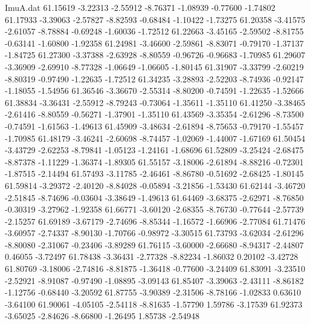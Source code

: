 \begin{filecontents}{ImuA.dat}
  61.15619   -3.22313   -2.55912   -8.76371   -1.08939   -0.77600   -1.74802
  61.17933   -3.39063   -2.57827   -8.82593   -0.68484   -1.10422   -1.73275
  61.20358   -3.41575   -2.61057   -8.78884   -0.69248   -1.60036   -1.72512
  61.22663   -3.45165   -2.59502   -8.81755   -0.63141   -1.60800   -1.92358
  61.24981   -3.46600   -2.59861   -8.83071   -0.79170   -1.37137   -1.84725
  61.27300   -3.37388   -2.63928   -8.80559   -0.96726   -0.96683   -1.70985
  61.29607   -3.36909   -2.69910   -8.77328   -1.06649   -1.06605   -1.80145
  61.31907   -3.33799   -2.60219   -8.80319   -0.97490   -1.22635   -1.72512
  61.34235   -3.28893   -2.52203   -8.74936   -0.92147   -1.18055   -1.54956
  61.36546   -3.36670   -2.55314   -8.80200   -0.74591   -1.22635   -1.52666
  61.38834   -3.36431   -2.55912   -8.79243   -0.73064   -1.35611   -1.35110
  61.41250   -3.38465   -2.61416   -8.80559   -0.56271   -1.37901   -1.35110
  61.43569   -3.35354   -2.61296   -8.73500   -0.74591   -1.61563   -1.49613
  61.45909   -3.48634   -2.61894   -8.75653   -0.79170   -1.55457   -1.70985
  61.48179   -3.46241   -2.60698   -8.74457   -1.02069   -1.44007   -1.67169
  61.50454   -3.43729   -2.62253   -8.79841   -1.05123   -1.24161   -1.68696
  61.52809   -3.25424   -2.68475   -8.87378   -1.11229   -1.36374   -1.89305
  61.55157   -3.18006   -2.61894   -8.88216   -0.72301   -1.87515   -2.14494
  61.57493   -3.11785   -2.46461   -8.86780   -0.51692   -2.68425   -1.80145
  61.59814   -3.29372   -2.40120   -8.84028   -0.05894   -3.21856   -1.53430
  61.62144   -3.46720   -2.51845   -8.74696   -0.03604   -3.38649   -1.49613
  61.64469   -3.68375   -2.62971   -8.76850   -0.30319   -3.27962   -1.92358
  61.66771   -3.60120   -2.68355   -8.76730   -0.77644   -2.57739   -2.15257
  61.69189   -3.67179   -2.74696   -8.85344   -1.16572   -1.66906   -2.77084
  61.71476   -3.60957   -2.74337   -8.90130   -1.70766   -0.98972   -3.30515
  61.73793   -3.62034   -2.61296   -8.80080   -2.31067   -0.23406   -3.89289
  61.76115   -3.60000   -2.66680   -8.94317   -2.44807    0.46055   -3.72497
  61.78438   -3.36431   -2.77328   -8.82234   -1.86032    0.20102   -3.42728
  61.80769   -3.18006   -2.74816   -8.81875   -1.36418   -0.77600   -3.24409
  61.83091   -3.23510   -2.52921   -8.91087   -0.97490   -1.08895   -3.09143
  61.85407   -3.39063   -2.43111   -8.86182   -1.12756   -0.68440   -3.20592
  61.87755   -3.90389   -2.31506   -8.78166   -1.02833    0.63610   -3.64100
  61.90061   -4.05105   -2.54118   -8.81635   -1.57790    1.59786   -3.17539
  61.92373   -3.65025   -2.84626   -8.66800   -1.26495    1.85738   -2.54948

\end{filecontents}
